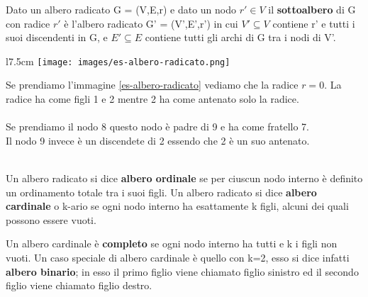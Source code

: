 \begin{definition}[Sottoalbero]
    Dato un albero radicato G = (V,E,r) e dato un nodo $r' \in V$ il \textbf{sottoalbero} di G con radice $r'$ è l'albero radicato G' = (V',E',r') in cui $V' \subseteq V$ contiene r' e tutti i suoi discendenti in G, e $E' \subseteq E$ contiene tutti gli archi di G tra i nodi di V'.
\end{definition}

\begin{wrapfigure}[9]{l}{7.5cm}
    \vspace{-15pt}
    \centering
    \texttt{[image: images/es-albero-radicato.png]}
    \caption{Albero radicato con radice r}
    \label{es-albero-radicato}
\end{wrapfigure}

Se prendiamo l'immagine \ref{es-albero-radicato} vediamo che la radice $r = 0$.
La radice ha come figli 1 e 2 mentre 2 ha come antenato solo la radice.\\\\
Se prendiamo il nodo 8 questo nodo è padre di 9 e ha come fratello 7.\\
Il nodo 9 invece è un discendete di 2 essendo che 2 è un suo antenato.\\\\

\begin{definition}
    Un albero radicato si dice \textbf{albero ordinale} se per ciuscun nodo interno è definito un ordinamento totale tra i suoi figli. Un albero radicato si dice \textbf{albero cardinale} o k-ario se ogni nodo interno ha esattamente k figli, alcuni dei quali possono essere vuoti.
\end{definition}

\begin{definition}
    Un albero cardinale è \textbf{completo} se ogni nodo interno ha tutti e k i figli non vuoti. Un caso speciale di albero cardinale è quello con k=2, esso si dice infatti \textbf{albero binario}; in esso il primo figlio viene chiamato figlio sinistro ed il secondo figlio viene chiamato figlio destro.
\end{definition}

